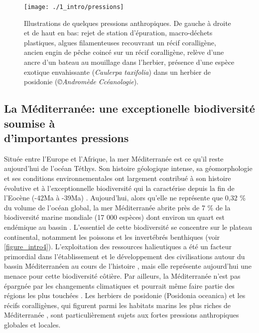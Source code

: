 \begin{figure}[H]
	\begin{center}
	\texttt{[image: ./1\_intro/pressions]}
		\caption[Illustrations de quelques pressions anthropiques]{Illustrations de quelques pressions anthropiques. De gauche à droite et de haut en bas: rejet de station d’épuration, macro-déchets plastiques, algues filamenteuses recouvrant un récif coralligène, ancien engin de pêche coincé sur un récif coralligène, relève d’une ancre d’un bateau au mouillage dans l’herbier, présence d’une espèce exotique envahissante (\textit{Caulerpa taxifolia}) dans un herbier de posidonie (\textit{©Andromède Ccéanologie}).}
	\label{figure_intro3}
\end{center}
\end{figure}

\subsection{La Méditerranée: une exceptionelle biodiversité soumise à \\ d’importantes pressions}\label{intro.1.3}

Située entre l’Europe et l’Afrique, la mer Méditerranée est ce qu’il reste aujourd’hui de l’océan Téthys. Son histoire géologique intense, sa géomorphologie et ses conditions environnementales ont largement contribué à son histoire évolutive et à l’exceptionnelle biodiversité qui la caractérise depuis la fin de l’Eocène (-42Ma à -39Ma) \citep{boudouresque_marine_2004, renema_hopping_2008}. Aujourd’hui, alors qu’elle ne représente que 0,32 \% du volume de l’océan global, la mer Méditerranée abrite près de 7 \% de la biodiversité marine mondiale (17 000 espèces) \citep{coll_biodiversity_2010} dont environ un quart est endémique au bassin \citep{bianchi_rmesualtrsine_2000}. L’essentiel de cette biodiversité se concentre sur le plateau continental, notamment les poissons et les invertébrés benthiques \citep{coll_mediterranean_2012, katsanevakis_invading_2014} (voir \autoref{figure_intro4}). L’exploitation des ressources halieutiques a été un facteur primordial dans l’établissement et le développement des civilisations autour du bassin Méditerranéen au cours de l’histoire \citep{coll_biodiversity_2010}, mais elle représente aujourd’hui une menace pour cette biodiversité côtière. Par ailleurs, la Méditerranée n’est pas épargnée par les changements climatiques et pourrait même faire partie des régions les plus touchées \citep{giorgi_climate_2006, adloff_mediterranean_2015}. Les herbiers de posidonie (Posidonia oceanica) et les récifs coralligènes, qui figurent parmi les habitats marins les plus riches de Méditerranée \citep{boudouresque_marine_2004}, sont particulièrement sujets aux fortes pressions anthropiques globales et locales.

